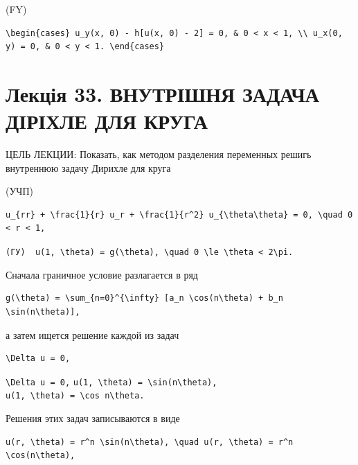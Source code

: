 \documentclass[
  ukrainian,
]{article}
\begin{document}
(FY)

\begin{verbatim}
\begin{cases} u_y(x, 0) - h[u(x, 0) - 2] = 0, & 0 < x < 1, \\ u_x(0, y) = 0, & 0 < y < 1. \end{cases}
\end{verbatim}

\section{Лекція 33. ВНУТРІШНЯ ЗАДАЧА ДІРІХЛЕ ДЛЯ
КРУГА}\label{ux43bux435ux43aux446ux456ux44f-33.-ux432ux43dux443ux442ux440ux456ux448ux43dux44f-ux437ux430ux434ux430ux447ux430-ux434ux456ux440ux456ux445ux43bux435-ux434ux43bux44f-ux43aux440ux443ux433ux430}

ЦЕЛЬ ЛЕКЦИИ: Показать, как методом разделения переменных решигь
внутреннюю задачу Дирихле для круга

(УЧП)

\begin{verbatim}
u_{rr} + \frac{1}{r} u_r + \frac{1}{r^2} u_{\theta\theta} = 0, \quad 0 < r < 1,
\end{verbatim}

\texttt{(ГУ)\ \ \textquotesingle{}u(1,\ \textbackslash{}theta)\ =\ g(\textbackslash{}theta),\ \textbackslash{}quad\ 0\ \textbackslash{}le\ \textbackslash{}theta\ \textless{}\ 2\textbackslash{}pi.\textquotesingle{}}

Сначала граничное условие разлагается в ряд

\begin{verbatim}
g(\theta) = \sum_{n=0}^{\infty} [a_n \cos(n\theta) + b_n \sin(n\theta)],
\end{verbatim}

а затем ищется решение каждой из задач

\begin{verbatim}
\Delta u = 0,
\end{verbatim}

\texttt{\textbackslash{}Delta\ u\ =\ 0,}
\texttt{u(1,\ \textbackslash{}theta)\ =\ \textbackslash{}sin(n\textbackslash{}theta),}
\texttt{u(1,\ \textbackslash{}theta)\ =\ \textbackslash{}cos\ n\textbackslash{}theta.}

Решения этих задач записываются в виде

\begin{verbatim}
u(r, \theta) = r^n \sin(n\theta), \quad u(r, \theta) = r^n \cos(n\theta),
\end{verbatim}
\end{document}
